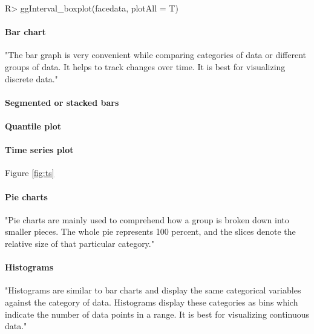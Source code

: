 \documentclass[article]{jss}
\begin{document}
\begin{CodeChunk}
\begin{CodeInput}
R> ggInterval_boxplot(facedata, plotAll = T)
\end{CodeInput}
\end{CodeChunk}


\paragraph{Bar chart} 
"The bar graph is very convenient while comparing categories of data or different groups of data. It helps to track changes over time. It is best for visualizing discrete data."

\paragraph{Segmented or stacked bars} 



\paragraph{Quantile plot} 



\paragraph{Time series plot} 

Figure \ref{fig:ts}

\paragraph{Pie charts} 
"Pie charts are mainly used to comprehend how a group is broken down into smaller pieces. The whole pie represents 100 percent, and the slices denote the relative size of that particular category."



\paragraph{Histograms} 
"Histograms are similar to bar charts and display the same categorical variables against the category of data. Histograms display these categories as bins which indicate the number of data points in a range. It is best for visualizing continuous data."
\end{document}
